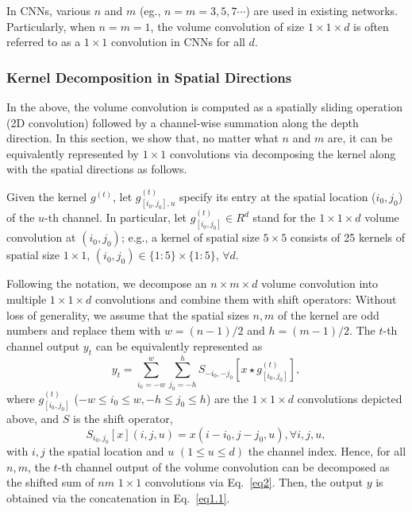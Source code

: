 \documentclass{article}
\begin{document}
	In CNNs, various $n$ and $m$ (eg., $n=m=3, 5, 7 \cdots$) are used in existing networks.
	Particularly, when $n=m=1$, the volume convolution of size $1\times 1 \times d$ is often referred to as a $1\times 1$ convolution in CNNs for all $d$.
	
	\subsubsection{Kernel Decomposition in Spatial Directions}
	In the above, the volume convolution is computed as a spatially sliding operation (2D convolution) followed by a channel-wise summation along the depth direction.
	In this section, we show that, no matter what $n$ and $m$ are, it can be equivalently represented by $1\times 1$ convolutions via decomposing the kernel along with the spatial directions as follows.
	
	Given the kernel $g^{(t)}$, let $g^{(t)}_{[i_0,j_0],u}$ specify its entry at the spatial location ($i_0,j_0$) of the $u$-th channel. In particular, let $g_{[i_0,j_0]}^{(t)}\in R^d$ stand for the $1\times 1 \times d$ volume convolution at $(i_0,j_0)$; %
	e.g., a kernel of spatial size $5\times 5$ consists of 25 kernels of spatial size $1\times 1$, $(i_0, j_0) \in \{1 : 5\} \times \{1 : 5\}$, $\forall d$.
	
	Following the notation, we decompose an $n\times m \times d$ volume convolution into multiple $1\times 1 \times d$ convolutions and combine them with shift operators:
	Without loss of generality, we assume that the spatial sizes $n, m$ of the kernel are odd numbers and replace them with $w=(n-1)/2$ and $h=(m-1)/2$.
	The $t$-th channel output $y_t$ can be equivalently represented as
	\begin{equation}
	\label{eq2}
	y_t =\sum_{i_0=-w}^{w}\sum_{j_0=-h}^{h} S_{-i_0, -j_0}[x \star g_{[i_0,j_0]}^{(t)}],
	\end{equation}
	where $g_{[i_0,j_0]}^{(t)}$ ($-w\leq i_0 \leq w, -h\leq j_0 \leq h$) are the $1\times 1 \times d $ convolutions depicted above, and %
	$S$ is the shift operator, %
	\begin{equation}
	S_{i_0,j_0}[x](i,j,u)= x(i-i_0,j-j_0,u), \forall i, j, u,
	\end{equation}
	with $i,j$ the spatial location and $u$ $(1\leq u \leq d)$ the channel index.
	Hence, for all $n,m$, the $t$-th channel output of the volume convolution can be decomposed as the shifted sum of $nm$ $1\times 1$ convolutions via Eq.~\ref{eq2}.
	Then, the output $y$ is obtained via the concatenation in Eq.~\ref{eq1.1}.
	
\end{document}
